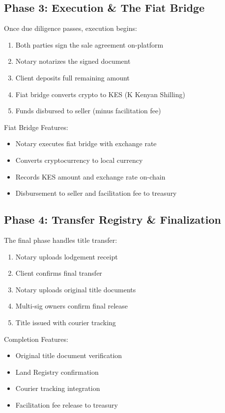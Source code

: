 \documentclass[12pt,a4paper]{article}
\begin{document}
\subsection{Phase 3: Execution \& The Fiat Bridge}
Once due diligence passes, execution begins:

\begin{enumerate}
\item Both parties sign the sale agreement on-platform
\item Notary notarizes the signed document
\item Client deposits full remaining amount
\item Fiat bridge converts crypto to KES (K Kenyan Shilling)
\item Funds disbursed to seller (minus facilitation fee)
\end{enumerate}

Fiat Bridge Features:
\begin{itemize}
\item Notary executes fiat bridge with exchange rate
\item Converts cryptocurrency to local currency
\item Records KES amount and exchange rate on-chain
\item Disbursement to seller and facilitation fee to treasury
\end{itemize}

\subsection{Phase 4: Transfer Registry \& Finalization}
The final phase handles title transfer:

\begin{enumerate}
\item Notary uploads lodgement receipt
\item Client confirms final transfer
\item Notary uploads original title documents
\item Multi-sig owners confirm final release
\item Title issued with courier tracking
\end{enumerate}

Completion Features:
\begin{itemize}
\item Original title document verification
\item Land Registry confirmation
\item Courier tracking integration
\item Facilitation fee release to treasury
\end{itemize}
\end{document}
